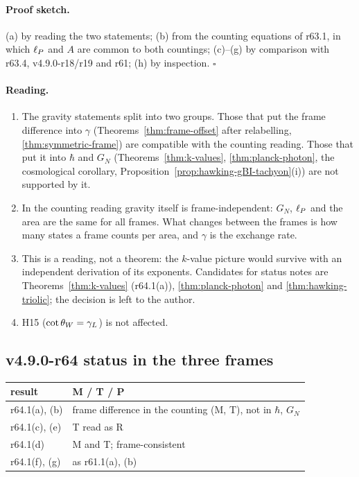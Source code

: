 \paragraph{Proof sketch.}
(a) by reading the two statements; (b) from the counting equations of r63.1, in which \(\ell_P\) and \(A\) are common to both countings; (c)--(g) by comparison with r63.4,
v4.9.0-r18/r19 and r61; (h) by inspection.  \(\square\)

\paragraph{Reading.}
\begin{enumerate}[leftmargin=2em]
\item The gravity statements split into two groups.  Those that put the frame difference into \(\gamma\) (Theorems~\ref{thm:frame-offset} after relabelling,
\ref{thm:symmetric-frame}) are compatible with the counting reading.  Those that put it into \(\hbar\) and \(G_N\) (Theorems~\ref{thm:k-values}, \ref{thm:planck-photon}, the
cosmological corollary, Proposition~\ref{prop:hawking-gBI-tachyon}(i)) are not supported by it.
\item In the counting reading gravity itself is frame-independent: \(G_N\), \(\ell_P\) and the area are the same for all frames.  What changes between the frames is how many
states a frame counts per area, and \(\gamma\) is the exchange rate.
\item This is a reading, not a theorem: the \(k\)-value picture would survive with an independent derivation of its exponents.  Candidates for status notes are
Theorems~\ref{thm:k-values} (r64.1(a)), \ref{thm:planck-photon} and \ref{thm:hawking-triolic}; the decision is left to the author.
\item H15 (\(\cot\theta_W=\gamma_L\)) is not affected.
\end{enumerate}

\subsection*{v4.9.0-r64 status in the three frames}
\label{subsec:v490-r64-frames}

\begin{center}
\small
\begin{tabular}{@{}>{\raggedright\arraybackslash}p{}>{\raggedright\arraybackslash}p{}@{}}
\toprule
result & M / T / P\\
\midrule
r64.1(a), (b) & frame difference in the counting (M, T), not in \(\hbar\), \(G_N\)\\
r64.1(c), (e) & T read as R\\
r64.1(d) & M and T; frame-consistent\\
r64.1(f), (g) & as r61.1(a), (b)\\
\bottomrule
\end{tabular}
\end{center}

